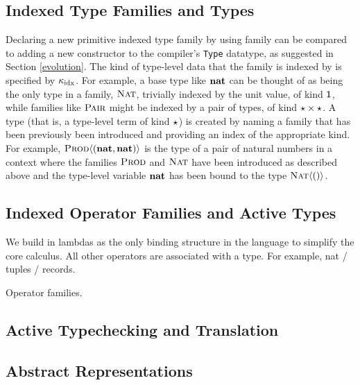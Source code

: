 \documentclass{llncs}
\begin{document}
\subsection{Indexed Type Families and Types}\label{families}
Declaring a new primitive indexed type family by using \textsf{family} can be compared to adding a new constructor to the compiler's \lstinline{Type} datatype, as suggested in Section \ref{evolution}. The kind of type-level data that the family is indexed by is specified by $\kappa_{\text{idx}}$. For example, a base type like ${\textbf{nat}}$ can be thought of as being the only type in a family, $\textsc{Nat}$, trivially indexed by the unit value, of kind $\textsf{1}$, while families like $\textsc{Pair}$ might be indexed by a pair of types, of kind $\star \times \star$. A type (that is, a type-level term of kind $\star$) is created by naming a family that has been previously been introduced and providing an index of the appropriate kind. For example, $\textsc{Prod}\langle({\textbf{nat}}, {\textbf{nat}})\rangle$ is the type of a pair of natural numbers in a context where the families $\textsc{Prod}$ and $\textsc{Nat}$ have been introduced as described above and the type-level variable ${\textbf{nat}}$ has been bound to the type $\textsc{Nat}\langle()\rangle$.

\subsection{Indexed Operator Families and Active Types}\label{operators}
We build in lambdas as the only binding structure in the language to simplify the core calculus. All other operators are associated with a type. For example, nat / tuples / records.

Operator families. 

\subsection{Active Typechecking and Translation}

\subsection{Abstract Representations}
\end{document}
